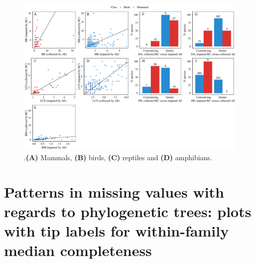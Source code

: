 \documentclass[11pt]{article}
\begin{document}
\begin{landscape}

\begin{figure}[h!]
\centering
\includegraphics[scale=0.6]{figures/Comparison_Cooke/Comparison_imputed_VS_collected}
\caption[]{\textbf{}.\textbf{(A)} Mammals, \textbf{(B)} birds, \textbf{(C)} reptiles and \textbf{(D)} amphibians.}
\label{compCooke}
\end{figure}

\end{landscape}

\pagebreak
\section{Patterns in missing values with regards to phylogenetic trees: plots with tip labels for within-family median completeness}

\pagebreak
\end{document}

